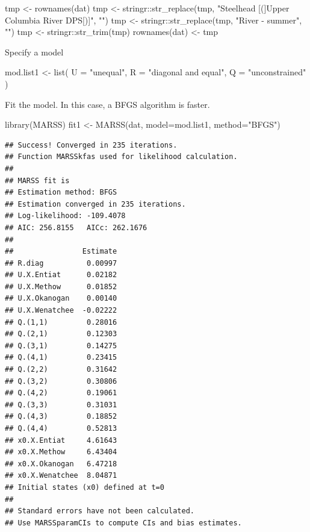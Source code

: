 \documentclass[
]{article}
\newenvironment{Shaded}{\begin{snugshade}}{\end{snugshade}}
\newcommand{\AttributeTok}[1]{\textcolor[rgb]{0.77,0.63,0.00}{#1}}
\newcommand{\FunctionTok}[1]{\textcolor[rgb]{0.00,0.00,0.00}{#1}}
\newcommand{\NormalTok}[1]{#1}
\newcommand{\OtherTok}[1]{\textcolor[rgb]{0.56,0.35,0.01}{#1}}
\newcommand{\SpecialCharTok}[1]{\textcolor[rgb]{0.00,0.00,0.00}{#1}}
\newcommand{\StringTok}[1]{\textcolor[rgb]{0.31,0.60,0.02}{#1}}
\begin{document}
\begin{Shaded}
\begin{Highlighting}[]
\NormalTok{tmp }\OtherTok{\textless{}{-}} \FunctionTok{rownames}\NormalTok{(dat)}
\NormalTok{tmp }\OtherTok{\textless{}{-}}\NormalTok{ stringr}\SpecialCharTok{::}\FunctionTok{str\_replace}\NormalTok{(tmp, }\StringTok{"Steelhead [(]Upper Columbia River DPS[)]"}\NormalTok{, }\StringTok{""}\NormalTok{)}
\NormalTok{tmp }\OtherTok{\textless{}{-}}\NormalTok{ stringr}\SpecialCharTok{::}\FunctionTok{str\_replace}\NormalTok{(tmp, }\StringTok{"River {-} summer"}\NormalTok{, }\StringTok{""}\NormalTok{)}
\NormalTok{tmp }\OtherTok{\textless{}{-}}\NormalTok{ stringr}\SpecialCharTok{::}\FunctionTok{str\_trim}\NormalTok{(tmp)}
\FunctionTok{rownames}\NormalTok{(dat) }\OtherTok{\textless{}{-}}\NormalTok{ tmp}
\end{Highlighting}
\end{Shaded}

Specify a model

\begin{Shaded}
\begin{Highlighting}[]
\NormalTok{mod.list1 }\OtherTok{\textless{}{-}} \FunctionTok{list}\NormalTok{(}
  \AttributeTok{U =} \StringTok{"unequal"}\NormalTok{,}
  \AttributeTok{R =} \StringTok{"diagonal and equal"}\NormalTok{,}
  \AttributeTok{Q =} \StringTok{"unconstrained"}
\NormalTok{)}
\end{Highlighting}
\end{Shaded}

Fit the model. In this case, a BFGS algorithm is faster.

\begin{Shaded}
\begin{Highlighting}[]
\FunctionTok{library}\NormalTok{(MARSS)}
\NormalTok{fit1 }\OtherTok{\textless{}{-}} \FunctionTok{MARSS}\NormalTok{(dat, }\AttributeTok{model=}\NormalTok{mod.list1, }\AttributeTok{method=}\StringTok{"BFGS"}\NormalTok{)}
\end{Highlighting}
\end{Shaded}

\begin{verbatim}
## Success! Converged in 235 iterations.
## Function MARSSkfas used for likelihood calculation.
## 
## MARSS fit is
## Estimation method: BFGS 
## Estimation converged in 235 iterations. 
## Log-likelihood: -109.4078 
## AIC: 256.8155   AICc: 262.1676   
##  
##                Estimate
## R.diag          0.00997
## U.X.Entiat      0.02182
## U.X.Methow      0.01852
## U.X.Okanogan    0.00140
## U.X.Wenatchee  -0.02222
## Q.(1,1)         0.28016
## Q.(2,1)         0.12303
## Q.(3,1)         0.14275
## Q.(4,1)         0.23415
## Q.(2,2)         0.31642
## Q.(3,2)         0.30806
## Q.(4,2)         0.19061
## Q.(3,3)         0.31031
## Q.(4,3)         0.18852
## Q.(4,4)         0.52813
## x0.X.Entiat     4.61643
## x0.X.Methow     6.43404
## x0.X.Okanogan   6.47218
## x0.X.Wenatchee  8.04871
## Initial states (x0) defined at t=0
## 
## Standard errors have not been calculated. 
## Use MARSSparamCIs to compute CIs and bias estimates.
\end{verbatim}
\end{document}
